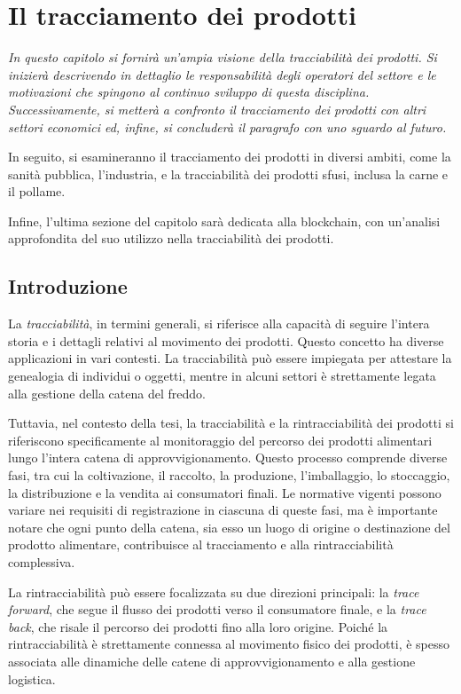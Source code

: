 \chapter{Il tracciamento dei prodotti}

\begin{preamble}
{\em 
In questo capitolo si fornirà un'ampia visione della tracciabilità dei prodotti. Si inizierà descrivendo in dettaglio le responsabilità degli operatori del settore e le motivazioni che spingono al continuo sviluppo di questa disciplina. Successivamente, si metterà a confronto il tracciamento dei prodotti con altri settori economici ed, infine, si concluderà il paragrafo con uno sguardo al futuro.

In seguito, si esamineranno il tracciamento dei prodotti in diversi ambiti, come la sanità pubblica, l'industria, e la tracciabilità dei prodotti sfusi, inclusa la carne e il pollame.

Infine, l'ultima sezione del capitolo sarà dedicata alla blockchain, con un'analisi approfondita del suo utilizzo nella tracciabilità dei prodotti.
}
\end{preamble}

\section{Introduzione}

La \textit{tracciabilità}, in termini generali, si riferisce alla capacità di seguire l'intera storia e i dettagli relativi al movimento dei prodotti. Questo concetto ha diverse applicazioni in vari contesti. La tracciabilità può essere impiegata per attestare la genealogia di individui o oggetti, mentre in alcuni settori è strettamente legata alla gestione della catena del freddo.

Tuttavia, nel contesto della tesi, la tracciabilità e la rintracciabilità dei prodotti si riferiscono specificamente al monitoraggio del percorso dei prodotti alimentari lungo l'intera catena di approvvigionamento. Questo processo comprende diverse fasi, tra cui la coltivazione, il raccolto, la produzione, l'imballaggio, lo stoccaggio, la distribuzione e la vendita ai consumatori finali. Le normative vigenti possono variare nei requisiti di registrazione in ciascuna di queste fasi, ma è importante notare che ogni punto della catena, sia esso un luogo di origine o destinazione del prodotto alimentare, contribuisce al tracciamento e alla rintracciabilità complessiva.

La rintracciabilità può essere focalizzata su due direzioni principali: la \textit{trace forward}, che segue il flusso dei prodotti verso il consumatore finale, e la \textit{trace back}, che risale il percorso dei prodotti fino alla loro origine. Poiché la rintracciabilità è strettamente connessa al movimento fisico dei prodotti, è spesso associata alle dinamiche delle catene di approvvigionamento e alla gestione logistica.

